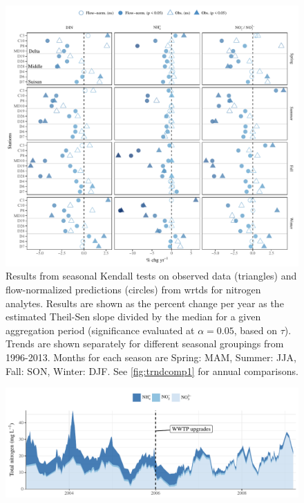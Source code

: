 \documentclass[journal = esthag, manuscript = article]{achemso}\usepackage[]{graphicx}\usepackage[]{color}
\begin{document}
\begin{suppinfo}
\begin{figure}
\centering
\includegraphics[width=1\textwidth,page=1]{figs/trndcomp3.pdf}
\caption{Results from seasonal Kendall tests on observed data (triangles) and flow-normalized predictions (circles) from \ac{wrtds} for nitrogen analytes. Results are shown as the percent change per year as the estimated Theil-Sen slope divided by the median for a given aggregation period (significance evaluated at $\alpha = 0.05$, based on $\tau$). Trends are shown separately for different seasonal groupings from 1996-2013. Months for each season are Spring: MAM, Summer: JJA, Fall: SON, Winter: DJF. See \cref{fig:trndcomp1} for annual comparisons.}
\label{fig:trndcomp3}   
\end{figure}

\begin{figure}[!ht]

{\centering \includegraphics[width=\textwidth]{figs/stock-1} 

}
\end{figure}
\end{suppinfo}
\end{document}
